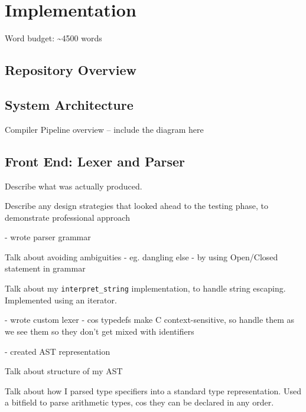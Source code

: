\documentclass[00-main.tex]{subfiles}
\begin{document}
\chapter{Implementation}

\begin{Comment}
Word budget: \textasciitilde 4500 words
\end{Comment}

\section{Repository Overview}

\section{System Architecture}

\begin{Comment}
Compiler Pipeline overview -- include the diagram here
\end{Comment}

\section{Front End: Lexer and Parser}

\begin{Comment}
Describe what was actually produced.

Describe any design strategies that looked ahead to the testing phase, to demonstrate professional approach

\end{Comment}

\begin{Comment}
- wrote parser grammar

Talk about avoiding ambiguities - eg. dangling else - by using Open/Closed statement in grammar

Talk about my \texttt{interpret\_string} implementation, to handle string escaping. Implemented using an iterator.

- wrote custom lexer - cos typedefs make C context-sensitive, so handle them as we see them so they don't get mixed with identifiers

- created AST representation

Talk about structure of my AST

Talk about how I parsed type specifiers into a standard type representation. Used a bitfield to parse arithmetic types, cos they can be declared in any order.
\end{Comment}
\end{document}

